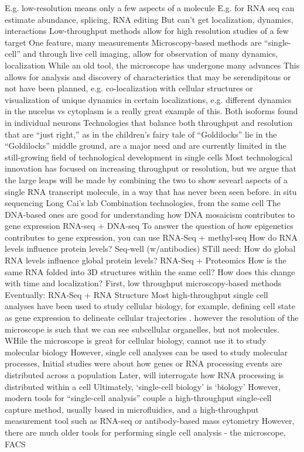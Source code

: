 E.g. low-resolution means only a few aspects of a molecule
E.g. for RNA seq can estimate abundance, splicing, RNA editing
But can't get localization, dynamics, interactions
Low-throughput methods allow for high resolution studies of a few target
One feature, many measurements
Microscopy-based methods are ``single-cell'' and through live cell imaging, allow for observation of many dynamics, localization
While an old tool, the microscope has undergone many advances
This allows for analysis and discovery of characteristics that may be serendipitous or not have been planned, e.g. co-localization with cellular structures or visualization of unique dynamics in certain localizations, e.g. different dynamics in the nucelus vs cytoplasm \cite{Yap:2016bs,Yap:2016ig} is a really great example of this. Both isoforms found in individual neurons
Technologies that balance both throughput and resolution that are ``just right,'' as in the children's fairy tale of ``Goldilocks''
lie in the ``Goldilocks'' middle ground, are a major need and are currently limited in the still-growing field of technological development in single cells
Most technological innovation has focused on increasing throughput or resolution, but we argue that the large leaps will be made by combining the two to show sevearl aspects of a single RNA transcript molecule, in a way that has never been seen before.
in situ sequencing Long Cai's lab \cite{Shah:2016iy}
Combination technologies, from the same cell
The DNA-based ones are good for understanding how DNA mosaicism contributes to gene expression
RNA-seq + DNA-seq
To answer the question of how epigenetics contributes to gene expression, you can use RNA-Seq + methyl-seq
How do RNA levels influence protein levels?
Seq-well (w/antibodies) \cite{Gierahn2017-ko}
STill need:
How do global RNA levels influence global protein levels?
RNA-Seq + Proteomics
How is the same RNA folded into 3D structures within the same cell? How does this change with time and localization?
First, low throughput microscopy-based methods
Eventually: RNA-Seq + RNA Structure
Most high-throughput single cell analyses have been used to study cellular biology, for example, defining cell state as gene expression to delineate cellular trajectories \cite{Cannoodt2016-mt}.
however the resolution of the microscope is such that we can see subcellular organelles, but not molecules.
WHile the microscope is great for cellular biology, cannot use it to study molecular biology
However, single cell analyses can be used to study molecular processes,
Initial studies were about how genes or RNA processing events are distributed across a population
Later, will interrogate how RNA processing is distributed within a cell
Ultimately, ‘single-cell biology' is ‘biology'
However, modern tools for ``single-cell analysis'' couple a high-throughput single-cell capture method, usually based in microfluidics, and a high-throughput measurement tool such as RNA-seq \cite{Ziegenhain:2017kr} or antibody-based mass cytometry \cite{Bendall2011-jm}
However, there are much older tools for performing single cell analysis - the microscope, FACS

